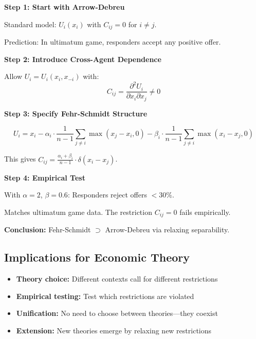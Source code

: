 \begin{tcolorbox}[colback=blue!5!white, colframe=blue!75!black,
    title=\textbf{Worked Example: Relaxing Separability}]

\textbf{Step 1: Start with Arrow-Debreu}

Standard model: $U_i(x_i)$ with $C_{ij} = 0$ for $i \neq j$.

Prediction: In ultimatum game, responders accept any positive offer.

\textbf{Step 2: Introduce Cross-Agent Dependence}

Allow $U_i = U_i(x_i, x_{-i})$ with:
\[
C_{ij} = \frac{\partial^2 U_i}{\partial x_i \partial x_j} \neq 0
\]

\textbf{Step 3: Specify Fehr-Schmidt Structure}

\[
U_i = x_i - \alpha_i \cdot \frac{1}{n-1} \sum_{j \neq i} \max(x_j - x_i, 0)
     - \beta_i \cdot \frac{1}{n-1} \sum_{j \neq i} \max(x_i - x_j, 0)
\]

This gives $C_{ij} = \frac{\alpha_i + \beta_i}{n-1} \cdot \delta(x_i - x_j)$.

\textbf{Step 4: Empirical Test}

With $\alpha = 2$, $\beta = 0.6$: Responders reject offers $< 30\%$.

Matches ultimatum game data. The restriction $C_{ij} = 0$ fails empirically.

\textbf{Conclusion:} Fehr-Schmidt $\supset$ Arrow-Debreu via relaxing separability.

\end{tcolorbox}


\subsection{Implications for Economic Theory}
\label{sec:A-implications}

\begin{itemize}[nosep]
    \item \textbf{Theory choice:} Different contexts call for different restrictions
    \item \textbf{Empirical testing:} Test which restrictions are violated
    \item \textbf{Unification:} No need to choose between theories---they coexist
    \item \textbf{Extension:} New theories emerge by relaxing new restrictions
\end{itemize}

